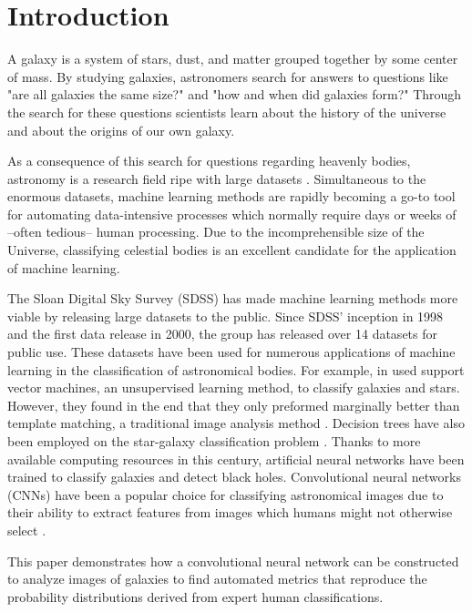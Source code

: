 \section{Introduction}

A galaxy is a system of stars, dust, and matter grouped together by some center of mass. By studying galaxies, astronomers search for answers to questions like "are all galaxies the same size?" and "how and when did galaxies form?" Through the search for these questions scientists learn about the history of the universe and about the origins of our own galaxy.


As a consequence of this search for questions regarding heavenly bodies, astronomy is a research field ripe with large datasets \cite{microsoft-galaxies}. Simultaneous to the enormous datasets, machine learning methods are rapidly becoming a go-to tool for automating data-intensive processes which normally require days or weeks of --often tedious-- human processing. Due to the incomprehensible size of the Universe, classifying celestial bodies is an excellent candidate for the application of machine learning.

The Sloan Digital Sky Survey (SDSS) has made machine learning methods more viable by releasing large datasets to the public. Since SDSS' inception in 1998 and the first data release in 2000, the group has released over 14 datasets for public use. These datasets have been used for numerous applications of machine learning in the classification of astronomical bodies. For example, \citeauthor{svn-galaxy} in \citeyear{svn-galaxy} used support vector machines, an unsupervised learning method, to classify galaxies and stars. However, they found in the end that they only preformed marginally better than template matching, a traditional image analysis method \cite{svn-galaxy}. Decision trees have also been employed on the star-galaxy classification problem \cite{ball-decision-trees}. Thanks to more available computing resources in this century, artificial neural networks have been trained to classify galaxies and detect black holes. Convolutional neural networks (CNNs) have been a popular choice for classifying astronomical images due to their ability to extract features from images which humans might not otherwise select \cite{cnn-star-galaxy}.

This paper demonstrates how a convolutional neural network can be constructed to analyze images of galaxies to find automated metrics that reproduce the probability distributions derived from expert human classifications.

